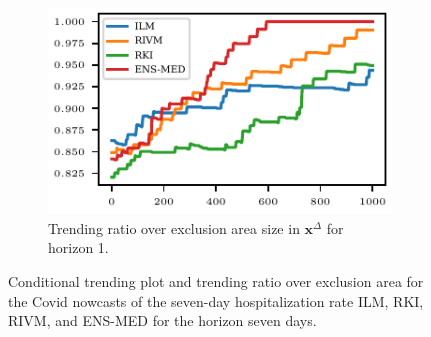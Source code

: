 \documentclass[pdflatex]{sn-jnl}
\theoremstyle{plain}%
\theoremstyle{definition}
\newcommand{\diffx}{\mathbf{x}^{\Delta}}
\begin{document}
\begin{figure}
\begin{subfigure}[t]{.48\textwidth}
    \end{subfigure}\hfill
    \begin{subfigure}[t]{.48\textwidth}
    \includegraphics{plots/covid_nowcast/40_acc_eps_lag_14}
    \caption{Trending ratio over exclusion area size in $\diffx$ for horizon 1.}\label{fig:app-covid-trending-ratio-14}
    \end{subfigure}
    \caption[Conditional trending plot and trending ratio over exclusion area in Covid nowcasting.]{Conditional trending plot and trending ratio over exclusion area for the Covid nowcasts of the seven-day hospitalization rate ILM, RKI, RIVM, and ENS-MED for the horizon seven days.}
    \label{fig:app-covid-cond-prob-trending-ratio-1-14}
\end{figure}
\end{document}

